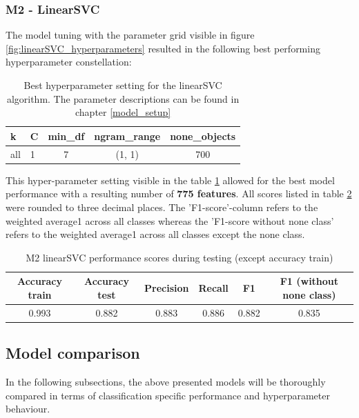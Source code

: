 \subsubsection{M2 - LinearSVC}
The model tuning with the parameter grid visible in figure \ref{fig:linearSVC_hyperparameters} resulted in the following best performing hyperparameter constellation:

\begin{table}[ht]
\begin{center}
\caption{Best hyperparameter setting for the linearSVC algorithm. The parameter descriptions can be found in chapter \ref{model_setup}}\vspace{1ex}
\label{tab:m2_linearSVC_bestParams}
\begin{tabular}{llccc}\hline
k & C & min\_df & ngram\_range & none\_objects \\ \hline
all & 1 & 7 & (1, 1) & 700 \\ \hline
\end{tabular}
\end{center}
\end{table}

This hyper-parameter setting visible in the table \ref{tab:m2_linearSVC_bestParams} allowed for the best model performance with a resulting number of \textbf{775 features}. All scores listed in table \ref{tab:m2_linearSVC_bestscores} were rounded to three decimal places. The 'F1-score'-column refers to the weighted average1 across all classes whereas the 'F1-score without none class' refers to the weighted average1 across all classes except the none class.

\begin{table}[ht]
\begin{center}
\caption{M2 linearSVC performance scores during testing (except accuracy train)}\vspace{1ex}
\label{tab:m2_linearSVC_bestscores}
\begin{tabular}{cccccc}\hline
Accuracy train & Accuracy test & Precision & Recall & F1 & F1 (without none class)\\ \hline
0.993 & 0.882 & 0.883 & 0.886 & 0.882 & 0.835 \\ \hline
\end{tabular}
\end{center}
\end{table}

\subsection{Model comparison}
In the following subsections, the above presented models will be thoroughly compared in terms of classification specific performance and hyperparameter behaviour. 

